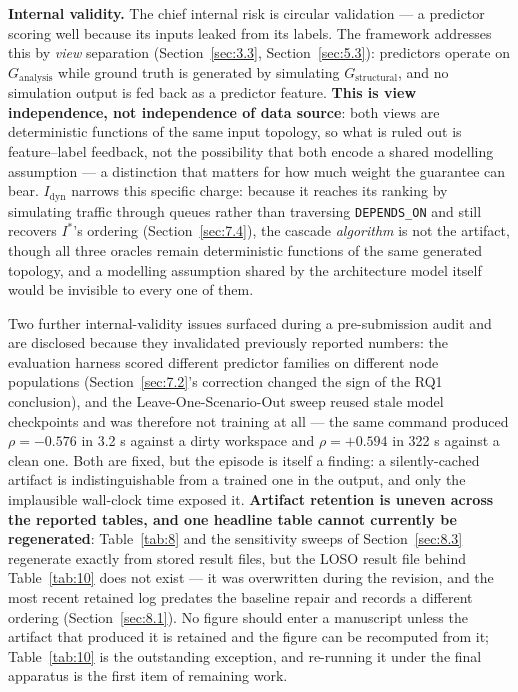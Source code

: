 \textbf{Internal validity.} The chief internal risk is circular validation --- a predictor scoring
well because its inputs leaked from its labels. The framework addresses this by \emph{view}
separation (Section~\ref{sec:3.3}, Section~\ref{sec:5.3}): predictors operate on
\(G_{\text{analysis}}\) while ground truth is generated by simulating \(G_{\text{structural}}\), and
no simulation output is fed back as a predictor feature. \textbf{This is view independence, not
independence of data source}: both views are deterministic functions of the same input topology, so
what is ruled out is feature--label feedback, not the possibility that both encode a shared modelling
assumption --- a distinction that matters for how much weight the guarantee can bear.
\(I_{\text{dyn}}\) narrows this specific charge: because it reaches its ranking by simulating traffic
through queues rather than traversing \texttt{DEPENDS\_ON} and still recovers \(I^*\)'s ordering
(Section~\ref{sec:7.4}), the cascade \emph{algorithm} is not the artifact, though all three oracles
remain deterministic functions of the same generated topology, and a modelling assumption shared by
the architecture model itself would be invisible to every one of them.

Two further internal-validity issues surfaced during a pre-submission audit and are disclosed because
they invalidated previously reported numbers: the evaluation harness scored different predictor
families on different node populations (Section~\ref{sec:7.2}'s correction changed the sign of the
RQ1 conclusion), and the Leave-One-Scenario-Out sweep reused stale model checkpoints and was
therefore not training at all --- the same command produced \(\rho=-0.576\) in 3.2 s against a dirty
workspace and \(\rho=+0.594\) in 322 s against a clean one. Both are fixed, but the episode is itself
a finding: a silently-cached artifact is indistinguishable from a trained one in the output, and only
the implausible wall-clock time exposed it. \textbf{Artifact retention is uneven across the reported
tables, and one headline table cannot currently be regenerated}: Table~\ref{tab:8} and the sensitivity
sweeps of Section~\ref{sec:8.3} regenerate exactly from stored result files, but the LOSO result file
behind Table~\ref{tab:10} does not exist --- it was overwritten during the revision, and the most
recent retained log predates the baseline repair and records a different ordering
(Section~\ref{sec:8.1}). No figure should enter a manuscript unless the artifact that produced it is
retained and the figure can be recomputed from it; Table~\ref{tab:10} is the outstanding exception,
and re-running it under the final apparatus is the first item of remaining work.

